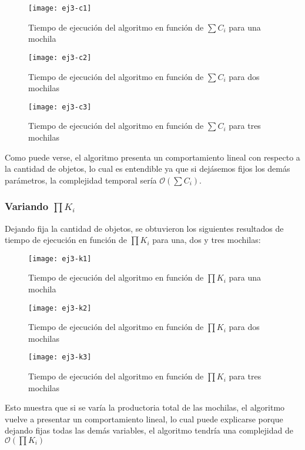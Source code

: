 \begin{figure}[H]
		\centering
		\texttt{[image: ej3-c1]}
		\caption{Tiempo de ejecución del algoritmo en función de $\sum C_i$ para una mochila}
	\end{figure}

\begin{figure}[H]
		\centering
		\texttt{[image: ej3-c2]}
		\caption{Tiempo de ejecución del algoritmo en función de $\sum C_i$ para dos mochilas}
	\end{figure}

\begin{figure}[H]
		\centering
		\texttt{[image: ej3-c3]}
		\caption{Tiempo de ejecución del algoritmo en función de $\sum C_i$ para tres mochilas}
	\end{figure}

Como puede verse, el algoritmo presenta un comportamiento lineal con respecto a la cantidad de objetos, lo cual es entendible ya que si dejásemos fijos los demás parámetros, la complejidad temporal sería $\mathcal{O}(\sum C_i)$. %

\subsubsection{Variando $\prod K_i$}

Dejando fija la cantidad de objetos, se obtuvieron los siguientes resultados de tiempo de ejecución en función de $\prod K_i$ para una, dos y tres mochilas:

\begin{figure}[H]
		\centering
		\texttt{[image: ej3-k1]}
		\caption{Tiempo de ejecución del algoritmo en función de $\prod K_i$ para una mochila}
	\end{figure}

\begin{figure}[H]
		\centering
		\texttt{[image: ej3-k2]}
		\caption{Tiempo de ejecución del algoritmo en función de $\prod K_i$ para dos mochilas}
	\end{figure}

\begin{figure}[H]
		\centering
		\texttt{[image: ej3-k3]}
		\caption{Tiempo de ejecución del algoritmo en función de $\prod K_i$ para tres mochilas}
	\end{figure}	

Esto muestra que si se varía la productoria total de las mochilas, el algoritmo vuelve a presentar un comportamiento lineal, lo cual puede explicarse porque dejando fijas todas las demás variables, el algoritmo tendría una complejidad de $\mathcal{O}(\prod K_i)$

